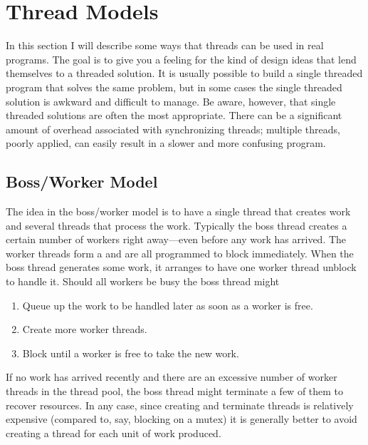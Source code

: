 
\section{Thread Models}
\label{sec:thread-models}

In this section I will describe some ways that threads can be used in real programs. The goal is
to give you a feeling for the kind of design ideas that lend themselves to a threaded solution.
It is usually possible to build a single threaded program that solves the same problem, but in
some cases the single threaded solution is awkward and difficult to manage. Be aware, however,
that single threaded solutions are often the most appropriate. There can be a significant amount
of overhead associated with synchronizing threads; multiple threads, poorly applied, can easily
result in a slower and more confusing program.

\subsection{Boss/Worker Model}
\label{subsec:bossworker-model}

The idea in the boss/worker model is to have a single  thread that creates work
and several  threads that process the work. Typically the boss thread creates a
certain number of workers right away---even before any work has arrived. The worker threads form
a  and are all programmed to block immediately. When the boss thread
generates some work, it arranges to have one worker thread unblock to handle it. Should all
workers be busy the boss thread might

\begin{enumerate}
  
\item Queue up the work to be handled later as soon as a worker is free.

\item Create more worker threads.

\item Block until a worker is free to take the new work.

\end{enumerate}

If no work has arrived recently and there are an excessive number of worker threads in the
thread pool, the boss thread might terminate a few of them to recover resources. In any case,
since creating and terminate threads is relatively expensive (compared to, say, blocking on a
mutex) it is generally better to avoid creating a thread for each unit of work produced.

